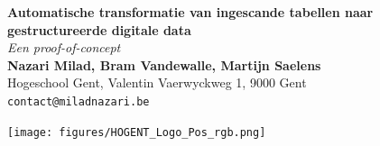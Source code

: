 \documentclass[a0,portrait]{a0poster}
\begin{document}


\begin{minipage}[t]{0.75\linewidth}
\VeryHuge \color{HoGentAccent1} \textbf{Automatische transformatie van ingescande tabellen naar gestructureerde digitale data} \color{Black}\\ %
\Huge\textit{Een proof-of-concept}\\[2.4cm] %
\huge \textbf{Nazari Milad, Bram Vandewalle, Martijn Saelens}\\[0.5cm] %
\huge Hogeschool Gent, Valentin Vaerwyckweg 1, 9000 Gent\\[0.4cm] %
\Large \texttt{contact@miladnazari.be} \\
\end{minipage}
%
\begin{minipage}[t]{0.25\linewidth}
\texttt{[image: figures/HOGENT\_Logo\_Pos\_rgb.png]} 

\end{minipage}

\vspace{1cm} %

\end{document}

